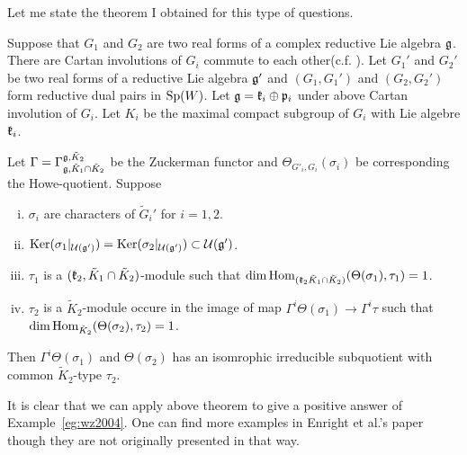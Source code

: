 \documentclass{amsart}
\begin{document}
Let me state the theorem I obtained for this type of questions.
\begin{thm}\label{thm:scaler}
  Suppose that 
  $G_1$ and $G_2$ are two real forms of a complex reductive Lie algebra $\mathfrak{g}$.
  There are Cartan involutions of $G_i$ commute to each other(c.f. \cite{WallachZhu2004}).
  Let $G_1'$ and $G_2'$ be two real forms of a reductive Lie algebra
  $\mathfrak{g}'$ and
  $(G_1,G_1')$ and $(G_2,G_2')$ form reductive dual pairs in ${\rm Sp}(W)$.
  Let
  $\mathfrak{g}=\mathfrak{k}_i \oplus \mathfrak{p}_i$ under above Cartan involution of $G_i$.
  Let $K_i$ be the maximal compact subgroup of $G_i$ with Lie algebre $\mathfrak{k}_i$.
 
  Let $\Gamma=\Gamma_{\mathfrak{g},\tilde{K}_1\cap \tilde{K}_2}^{\mathfrak{g}, \tilde{K}_2}$ be the Zuckerman functor
  and $\Theta_{G'_i,G_i}(\sigma_i)$ be corresponding the Howe-quotient.
  Suppose 
  \begin{enumerate}[(i)]
    \item $\sigma_i$ are characters of $\tilde{G}_i'$ for $i=1,2$. 
  \item  ${\rm Ker}(\sigma_1|_{\mathcal{U}(\mathfrak{g}')}) = {\rm Ker}(\sigma_2|_{\mathcal{U}(\mathfrak{g}')}) \subset \mathcal{U}(\mathfrak{g}')$.
  \item $\tau_1$ is a $(\mathfrak{k}_2,\tilde{K}_1\cap \tilde{K}_2)$-module such that
    $\dim {\rm Hom}_{(\mathfrak{k}_2\tilde{K}_1\cap \tilde{K}_2)}(\Theta(\sigma_1),\tau_1) = 1$.
  \item $\tau_2$ is a $\tilde{K}_2$-module occure in the
    image of map $\Gamma^i \Theta(\sigma_1) \to \Gamma^i \tau$ 
    such that 
    $\dim {\rm Hom}_{\tilde{K}_2}(\Theta(\sigma_2),\tau_2) =1$.
  \end{enumerate}
  Then $\Gamma^i \Theta(\sigma_1)$ and 
  $\Theta(\sigma_2)$ has an isomrophic irreducible subquotient 
  with common $\tilde{K}_2$-type $\tau_2$.
\end{thm}

\begin{rmk}
It is clear that we can apply above theorem to give a positive answer of Example~\ref{eg:wz2004}.
One can find more examples in Enright et al.'s paper  \cite{Enright1985}
though they are not originally presented in that way. 
\end{rmk}
\end{document}
